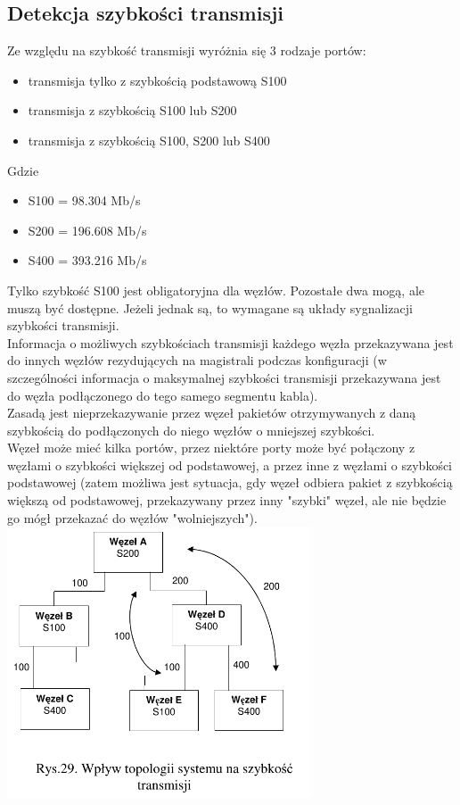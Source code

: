 \subsection{Detekcja szybkości transmisji}
Ze względu na szybkość transmisji wyróżnia się 3 rodzaje portów:
\begin{itemize}
	\item transmisja tylko z szybkością podstawową S100
	\item transmisja z szybkością S100 lub S200
	\item transmisja z szybkością S100, S200 lub S400
\end{itemize}
Gdzie
\begin{itemize}
	\item S100 = 98.304 Mb/s
	\item S200 = 196.608 Mb/s
	\item S400 = 393.216 Mb/s
\end{itemize}
Tylko szybkość S100 jest obligatoryjna dla węzłów. Pozostałe dwa mogą, ale muszą być dostępne. Jeżeli jednak są, to wymagane są układy sygnalizacji szybkości transmisji.\\
Informacja o możliwych szybkościach transmisji każdego węzła przekazywana jest do innych węzłów rezydujących na magistrali podczas konfiguracji (w szczególności informacja o maksymalnej szybkości transmisji przekazywana jest do węzła podłączonego do tego samego segmentu kabla).\\
Zasadą jest nieprzekazywanie przez węzeł pakietów otrzymywanych z daną szybkością do podłączonych do niego węzłów o mniejszej szybkości.\\
Węzeł może mieć kilka portów, przez niektóre porty może być połączony z węzłami o szybkości większej od podstawowej, a przez inne z węzłami o szybkości podstawowej (zatem możliwa jest sytuacja, gdy węzeł odbiera pakiet z szybkością większą od podstawowej, przekazywany przez inny "szybki" węzeł, ale nie będzie go mógł przekazać do węzłów "wolniejszych").\\
\includegraphics[width=9cm]{./wyklady/FIREWIRE_31_1.pdf}


